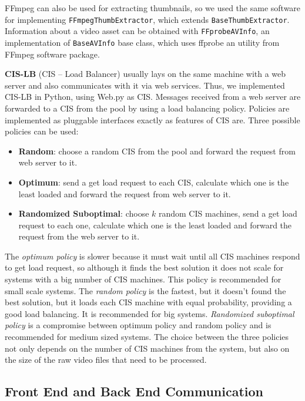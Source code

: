FFmpeg can also be used for extracting thumbnails, so we used the same software for implementing \texttt{FFmpegThumbExtractor}, which extends \texttt{BaseThumbExtractor}. Information about a video asset can be obtained with \texttt{FFprobeAVInfo}, an implementation of \texttt{BaseAVInfo} base class, which uses ffprobe an utility from FFmpeg software package.

\textbf{CIS-LB} (CIS -- Load Balancer) usually lays on the same machine with a web server and also communicates with it via web services. Thus, we implemented CIS-LB in Python, using Web.py as CIS. Messages received from a web server are forwarded to a CIS from the pool by using a load balancing policy. Policies are implemented as pluggable interfaces exactly as features of CIS are. Three possible policies can be used:

\begin{itemize}
 \item \textbf{Random}: choose a random CIS from the pool and forward the request from web server to it.
 \item \textbf{Optimum}: send a get load request to each CIS, calculate which one is the least loaded and forward the request from web server to it.
 \item \textbf{Randomized Suboptimal}: choose $k$ random CIS machines, send a get load request to each one, calculate which one is the least loaded and forward the request from the web server to it.
\end{itemize}

The \textit{optimum policy} is slower because it must wait until all CIS machines respond to get load request, so although it finds the best solution it does not scale for systems with a big number of CIS machines. This policy is recommended for small scale systems. The \textit{random policy} is the fastest, but it doesn't found the best solution, but it loads each CIS machine with equal probability, providing a good load balancing. It is recommended for big systems.  \textit{Randomized suboptimal policy} is a compromise between optimum policy and random policy and is recommended for medium sized systems. The choice between the three policies not only depends on the number of CIS machines from the system, but also on the size of the raw video files that need to be processed.

\subsection{Front End and Back End Communication}
\label{subsec:communication}

